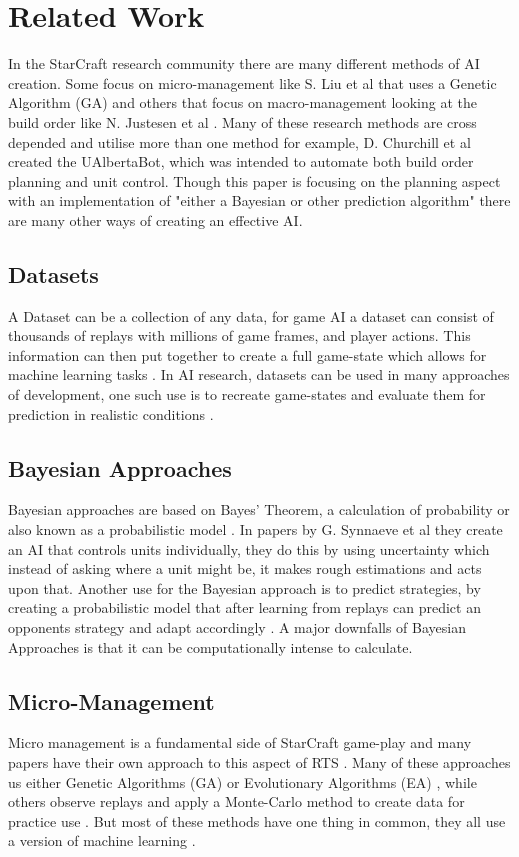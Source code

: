 \documentclass[journal]{IEEEtran}
\begin{document}
\section{Related Work}
In the StarCraft research community there are many different methods of AI creation. Some focus on micro-management like S. Liu et al \cite{EffectiveMicro} that uses a Genetic Algorithm (GA) and others that focus on macro-management looking at the build order like N. Justesen et al \cite{OnlineEvo}. Many of these research methods are cross depended and utilise more than one method for example, D. Churchill et al \cite{Agents} created the UAlbertaBot, which was intended to automate both build order planning and unit control. Though this paper is focusing on the planning aspect with an implementation of "either a Bayesian or other prediction algorithm" there are many other ways of creating an effective AI.

\subsection{Datasets}
A Dataset can be a collection of any data, for game AI a dataset can consist of thousands of replays with millions of game frames, and player actions\cite{Dataset}. This information can then put together to create a full game-state which allows for machine learning tasks \cite{Dataset17}. In AI research, datasets can be used in many approaches of development, one such use is to recreate game-states and evaluate them for prediction in realistic conditions \cite{SpecialTactics}.

 
\subsection{Bayesian Approaches}
Bayesian approaches are based on Bayes' Theorem, a calculation of probability or also known as a probabilistic model \cite{BayesianAI}. In papers by G. Synnaeve et al \cite{UnitsControl}\cite{SpecialTactics} they create an AI that controls units individually, they do this by using uncertainty which instead of asking where a unit might be, it makes rough estimations and acts upon that. Another use for the Bayesian approach is to predict strategies, by creating a probabilistic model that after learning from replays can predict an opponents strategy and adapt accordingly \cite{Bayesian}. A major downfalls of Bayesian Approaches is that it can be computationally intense to calculate.

\subsection{Micro-Management}
Micro management is a fundamental side of StarCraft game-play and many papers have their own approach to this aspect of RTS \cite{SOMA}\cite{EffectiveMicro}\cite{Swarm}\cite{MM}\cite{SpecialTactics}\cite{UnitsControl}. Many of these approaches us either Genetic Algorithms (GA) or Evolutionary Algorithms (EA) \cite{SOMA}\cite{EffectiveMicro}\cite{Swarm}, while others observe replays and apply a Monte-Carlo method to create data for practice use \cite{MM}. But most of these methods have one thing in common, they all use a version of machine learning \cite{Survey}.
\end{document}
